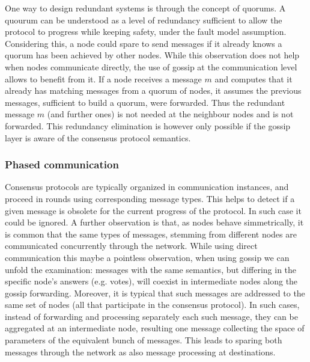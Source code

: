 One way to design redundant systems is through the concept of quorums.
A quourum can be understood as a level of redundancy sufficient to allow the protocol to progress while keeping safety, under the fault model assumption.    
Considering this, a node could spare to send messages if it already knows a quorum has been
achieved by other nodes.
While this observation does not help when nodes communicate directly,
%
%
the use of gossip at the communication level allows to benefit from it.  
If a node receives a message $m$ and computes that it already has matching messages from a quorum of nodes, it assumes the previous messages, sufficient to build a quorum, were forwarded.  Thus the redundant message $m$ (and further ones) is not needed at the neighbour nodes and is not forwarded.
This redundancy elimination is however only possible if the gossip layer is aware of the consensus protocol semantics.

\subsubsection{Phased communication}
\label{obsolete}
Consensus protocols are typically organized in communication instances, and proceed in rounds using corresponding message types.
This helps to detect if a given message is obsolete for the current progress of the protocol. %
In such case it could be ignored.
%
A further observation is that,
as nodes behave simmetrically, 
it is common that the same types of messages, stemming from different nodes are communicated concurrently through the network.
%
While using direct communication this maybe a pointless observation,
when using gossip we can unfold the examination:
messages with the same semantics, but differing in the specific node's
answers (e.g. votes), will coexist in intermediate nodes along the gossip forwarding.
Moreover, it is typical that such messages are addressed to the same set of nodes (all that participate in the consensus protocol).  
In such cases, instead of forwarding and processing separately each such message, they can be aggregated at an intermediate node, 
resulting one message collecting the space of parameters of the equivalent bunch of messages.
This leads to sparing both messages through the network as also message processing at destinations. 

